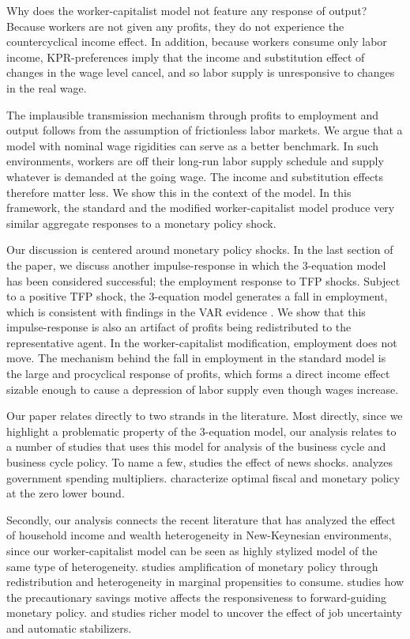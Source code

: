 Why does the worker-capitalist model not feature any response of output? Because workers are not given any profits, they do not experience the countercyclical income effect. In addition, because workers consume only labor income, KPR-preferences imply that the income and substitution effect of changes in the wage level cancel, and so labor supply is unresponsive to changes in the real wage. 

The implausible transmission mechanism through profits to employment and output follows from the assumption of frictionless labor markets. We argue that a model with nominal wage rigidities can serve as a better benchmark. In such environments, workers are off their long-run labor supply schedule and supply whatever is demanded at the going wage. The income and substitution effects therefore matter less. We show this in the context of the \citet{Erceg2000} model. In this framework, the standard and the modified worker-capitalist model produce very similar aggregate responses to a monetary policy shock. 

Our discussion is centered around monetary policy shocks. In the last section of the paper, we discuss another impulse-response in which the 3-equation model has been considered successful; the employment response to TFP shocks. Subject to a positive TFP shock, the 3-equation model generates a fall in employment, which is consistent with findings in the VAR evidence \citep{Gali1999,Gali2004,Francis2005,Basu2006}. We show that this impulse-response is also an artifact of profits being redistributed to the representative agent. In the worker-capitalist modification, employment does not move. The mechanism behind the fall in employment in the standard model is the large and procyclical response of profits, which forms a direct income effect sizable enough to cause a depression of labor supply even though wages increase. 
 
Our paper relates directly to two strands in the literature. Most directly, since we highlight a problematic property of the 3-equation model, our analysis relates to a number of studies that uses this model for analysis of the business cycle and business cycle policy. To name a few, \citet{Lorenzoni2009} studies the effect of news shocks. \citet{Christiano2011} analyzes government spending multipliers. \citet{Werning2012} characterize optimal fiscal and monetary policy at the zero lower bound. 

Secondly, our analysis connects the recent literature that has analyzed the effect of household income and wealth heterogeneity in New-Keynesian environments, since our worker-capitalist model can be seen as highly stylized model of the same type of heterogeneity. \citet{Auclert2015} studies amplification of monetary policy through redistribution and heterogeneity in marginal propensities to consume. \citet{McKay2015} studies how the precautionary savings motive affects the responsiveness to forward-guiding monetary policy. \citet{McKay2013} and \citet{Ravn2012a} studies richer model to uncover the effect of job uncertainty and automatic stabilizers. 